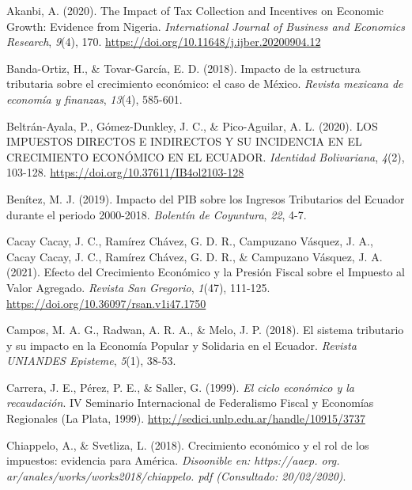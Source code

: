 \documentclass[
  jou,
  floatsintext,
  longtable,
  a4paper,
  nolmodern,
  notxfonts,
  notimes,
  12pt,
  colorlinks=true,linkcolor=blue,citecolor=blue,urlcolor=blue]{apa7}
\newlength{\cslhangindent}
\newenvironment{CSLReferences}[2] %
 {\begin{list}{}{%
  \setlength{\itemindent}{0pt}
  \setlength{\leftmargin}{0pt}
  \setlength{\parsep}{0pt}
  \ifodd #1
   \setlength{\leftmargin}{\cslhangindent}
   \setlength{\itemindent}{-1\cslhangindent}
  \fi
  \setlength{\itemsep}{#2\baselineskip}}}
 {\end{list}}
\begin{document}
\protect{}\label{refs}
\begin{CSLReferences}{1}{0}
Akanbi, A. (2020). The Impact of Tax Collection and Incentives on
Economic Growth: Evidence from Nigeria. \emph{International Journal of
Business and Economics Research}, \emph{9}(4), 170.
\url{https://doi.org/10.11648/j.ijber.20200904.12}

Banda-Ortiz, H., \& Tovar-García, E. D. (2018). Impacto de la estructura
tributaria sobre el crecimiento económico: el caso de México.
\emph{Revista mexicana de economía y finanzas}, \emph{13}(4), 585-601.

Beltrán-Ayala, P., Gómez-Dunkley, J. C., \& Pico-Aguilar, A. L. (2020).
{LOS} {IMPUESTOS} {DIRECTOS} E {INDIRECTOS} Y {SU} {INCIDENCIA} {EN}
{EL} {CRECIMIENTO} {ECONÓMICO} {EN} {EL} {ECUADOR}. \emph{Identidad
Bolivariana}, \emph{4}(2), 103-128.
\url{https://doi.org/10.37611/IB4ol2103-128}

Benítez, M. J. (2019). Impacto del {PIB} sobre los Ingresos Tributarios
del Ecuador durante el periodo 2000-2018. \emph{Bolentín de Coyuntura},
\emph{22}, 4-7.

Cacay Cacay, J. C., Ramírez Chávez, G. D. R., Campuzano Vásquez, J. A.,
Cacay Cacay, J. C., Ramírez Chávez, G. D. R., \& Campuzano Vásquez, J.
A. (2021). Efecto del Crecimiento Económico y la Presión Fiscal sobre el
Impuesto al Valor Agregado. \emph{Revista San Gregorio}, \emph{1}(47),
111-125. \url{https://doi.org/10.36097/rsan.v1i47.1750}

Campos, M. A. G., Radwan, A. R. A., \& Melo, J. P. (2018). El sistema
tributario y su impacto en la Economía Popular y Solidaria en el
Ecuador. \emph{Revista {UNIANDES} Episteme}, \emph{5}(1), 38-53.

Carrera, J. E., Pérez, P. E., \& Saller, G. (1999). \emph{El ciclo
económico y la recaudación}. {IV} Seminario Internacional de Federalismo
Fiscal y Economías Regionales (La Plata, 1999).
\url{http://sedici.unlp.edu.ar/handle/10915/3737}

Chiappelo, A., \& Svetliza, L. (2018). Crecimiento económico y el rol de
los impuestos: evidencia para América. \emph{Disoonible en:
https://aaep. org. ar/anales/works/works2018/chiappelo. pdf (Consultado:
20/02/2020)}.


\end{CSLReferences}
\end{document}

